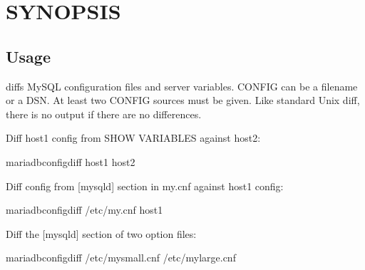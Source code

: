 \documentclass[letterpaper,10pt,english]{sphinxmanual}
\begin{document}
\section{SYNOPSIS}
\label{\detokenize{mariadb-config-diff:synopsis}}

\subsection{Usage}
\label{\detokenize{mariadb-config-diff:usage}}
\begin{sphinxVerbatim}[commandchars=\\\{\}]
 \PYG{p}{[}\PYG{p}{]}   \PYG{p}{[}\PYG{p}{]}
\end{sphinxVerbatim}

 diffs MySQL configuration files and server variables.
CONFIG can be a filename or a DSN.  At least two CONFIG sources must be given.
Like standard Unix diff, there is no output if there are no differences.

Diff host1 config from SHOW VARIABLES against host2:

\begin{sphinxVerbatim}[commandchars=\\\{\}]
mariadb\PYGZhy{}config\PYGZhy{}diff host1 host2
\end{sphinxVerbatim}

Diff config from {[}mysqld{]} section in my.cnf against host1 config:

\begin{sphinxVerbatim}[commandchars=\\\{\}]
mariadb\PYGZhy{}config\PYGZhy{}diff /etc/my.cnf host1
\end{sphinxVerbatim}

Diff the {[}mysqld{]} section of two option files:

\begin{sphinxVerbatim}[commandchars=\\\{\}]
mariadb\PYGZhy{}config\PYGZhy{}diff /etc/my\PYGZhy{}small.cnf /etc/my\PYGZhy{}large.cnf
\end{sphinxVerbatim}
\end{document}
